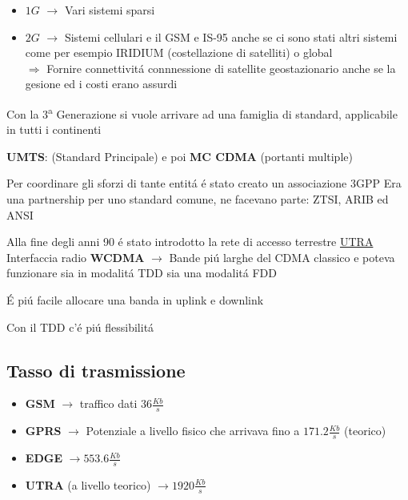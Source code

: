 \documentclass{article}
\begin{document}
\begin{itemize}
    \item $1G$ $\rightarrow$ Vari sistemi sparsi
    \item $2G$ $\rightarrow$ Sistemi cellulari e il GSM e IS-95 anche se ci sono stati altri sistemi come per esempio IRIDIUM (costellazione di satelliti) o global\\
        $\Rightarrow$ Fornire connettivit\'a connnessione di satellite geostazionario anche se la gesione ed i costi erano assurdi
\end{itemize}

Con la 3\textsuperscript{a} Generazione si vuole arrivare ad una famiglia di standard, applicabile in tutti i continenti

\textbf{UMTS}: (Standard Principale) e poi \textbf{MC CDMA} (portanti multiple)


Per coordinare gli sforzi di tante entit\'a \'e stato creato un associazione 3GPP
Era una partnership per uno standard comune, ne facevano parte: ZTSI, ARIB ed ANSI

Alla fine degli anni 90 \'e stato introdotto la rete di accesso terrestre \underline{UTRA}
Interfaccia radio \textbf{WCDMA} $\rightarrow$ Bande pi\'u larghe del CDMA classico e  poteva funzionare sia in modalit\'a TDD sia una modalit\'a FDD

\'E pi\'u facile allocare una banda in uplink e downlink

Con il TDD c'\'e pi\'u flessibilit\'a


\subsection{Tasso di trasmissione}
\begin{itemize}
    \item \textbf{GSM} $\rightarrow$ traffico dati $36 \frac{Kb}{s}$
    \item \textbf{GPRS} $\rightarrow$ Potenziale a livello fisico che arrivava fino a $171.2\frac{Kb}{s}$ (teorico)
    \item \textbf{EDGE} $\rightarrow 553.6\frac{Kb}{s}$
    \item \textbf{UTRA} (a livello teorico) $\rightarrow 1920\frac{Kb}{s}$
\end{itemize}
\end{document}
